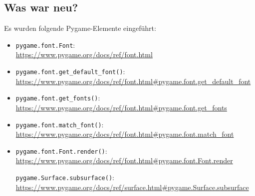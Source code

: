 \subsection*{Was war neu?}

Es wurden folgende Pygame-Elemente eingeführt:

\begin{itemize}
	\item \texttt{pygame.font.Font}:
	\\ \url{https://www.pygame.org/docs/ref/font.html}
	
	\item \texttt{pygame.font.get\_default\_font()}:
	\\ \url{https://www.pygame.org/docs/ref/font.html#pygame.font.get_default_font}

	\item \texttt{pygame.font.get\_fonts()}:
	\\ \url{https://www.pygame.org/docs/ref/font.html#pygame.font.get_fonts}
	
    \item \texttt{pygame.font.match\_font()}:
    \\
    \url{https://www.pygame.org/docs/ref/font.html#pygame.font.match_font}

	\item \texttt{pygame.font.Font.render()}:
    \\ \url{https://www.pygame.org/docs/ref/font.html#pygame.font.Font.render}

	\texttt{pygame.Surface.subsurface()}:
    \\ \url{https://www.pygame.org/docs/ref/surface.html#pygame.Surface.subsurface}


\end{itemize}

